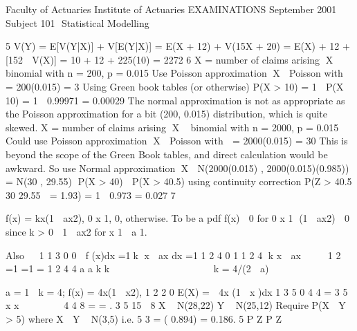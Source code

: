 \documentclass[a4paper,12pt]{article}
\begin{document}

Faculty of Actuaries Institute of Actuaries
EXAMINATIONS
September 2001
Subject 101  Statistical Modelling

5 V(Y) = E[V(Y|X)] + V[E(Y|X)]
= E(X + 12) + V(15X + 20)
= E(X) + 12 + [152  V(X)]
= 10 + 12 + 225(10) = 2272
6  X = number of claims arising
X ~ binomial with n = 200, p = 0.015
Use Poisson approximation
X  Poisson with  = 200(0.015) = 3
Using Green book tables (or otherwise)
P(X > 10) = 1  P(X  10) = 1  0.99971 = 0.00029
The normal approximation is not as appropriate as the Poisson
approximation for a bit (200, 0.015) distribution, which is quite skewed.
\bigskip X = number of claims arising X ~ binomial with n = 2000, p = 0.015
Could use Poisson approximation X  Poisson with  = 2000(0.015) = 30
This is beyond the scope of the Green Book tables, and direct calculation
would be awkward. So use Normal approximation
X  N(2000(0.015) , 2000(0.015)(0.985)) = N(30 , 29.55)
P(X > 40)  P(X > 40.5) using continuity correction
	 P(Z >
40.5 30
29.55
 = 1.93) = 1  0.973 = 0.027
7 \item
f(x) = kx(1  ax2), 0 
 x 
 1,
0, otherwise.
To be a pdf f(x)  0 for 0 
 x 
 1  (1  ax2)  0 since k > 0
 1  ax2 for x 
 1  a 
 1.

Also  
1 1 3
0 0
 f (x)dx =1k x  ax dx =1
1
2 4
0
1 1
2 4
k x  ax  
 
1 2
=1 =1 = 1
2 4 4
a a
k k
    
      
   
 k = 4/(2  a)
\item a = 1  k = 4; f(x) = 4x(1  x2),
1 2 2
0
E(X) =  4x (1  x )dx
1
3 5
0
4 4
=
3 5
x x
 
  
 
4 4 8
= = .
3 5 15 
8 X ~ N(28,22) Y ~ N(25,12)
Require P(X  Y > 5)
where X  Y ~ N(3,5)
i.e.
5 3
= ( 0.894) = 0.186.
5
P Z P Z
  
   
\end{document}
